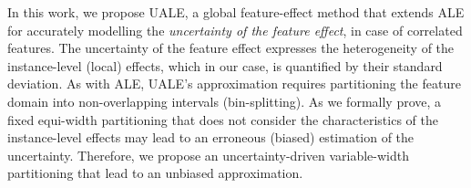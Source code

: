 \documentclass[twoside]{article}
\newcommand{\todo}[1]{[\textcolor{red}{#1}]}
\begin{document}




In this work, we propose UALE, a global feature-effect method that
extends ALE for accurately modelling the \emph{uncertainty of the
  feature effect}, in case of correlated features. The uncertainty of
the feature effect expresses the heterogeneity of the instance-level
(local) effects, which in our case, is quantified by their standard
deviation. As with ALE, UALE's approximation requires partitioning the
feature domain into non-overlapping intervals (bin-splitting). As we
formally prove, a fixed equi-width partitioning that does not consider
the characteristics of the instance-level effects may lead to an
erroneous (biased) estimation of the uncertainty. Therefore, we
propose an uncertainty-driven variable-width partitioning that lead to
an unbiased approximation.



\end{document}
